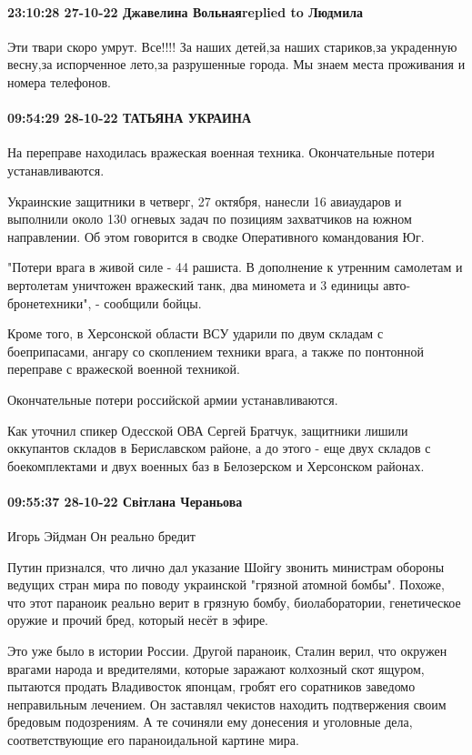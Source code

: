 \paragraph{23:10:28 27-10-22 Джавелина Вольнаяreplied to Людмила}

Эти твари скоро умрут. Все!!!! За наших детей,за наших стариков,за украденную
весну,за испорченное лето,за разрушенные города. Мы знаем места проживания и
номера телефонов.

\paragraph{09:54:29 28-10-22 ТАТЬЯНА УКРАИНА}

На переправе находилась вражеская военная техника. Окончательные потери
устанавливаются.

Украинские защитники в четверг, 27 октября, нанесли 16 авиаударов и выполнили
около 130 огневых задач по позициям захватчиков на южном направлении. Об этом
говорится в сводке Оперативного командования Юг.

"Потери врага в живой силе - 44 рашиста. В дополнение к утренним самолетам и
вертолетам уничтожен вражеский танк, два миномета и 3 единицы
авто-бронетехники", - сообщили бойцы.

Кроме того, в Херсонской области ВСУ ударили по двум складам с боеприпасами,
ангару со скоплением техники врага, а также по понтонной переправе с вражеской
военной техникой.

Окончательные потери российской армии устанавливаются.

Как уточнил спикер Одесской ОВА Сергей Братчук, защитники лишили оккупантов
складов в Бериславском районе, а до этого - еще двух складов с боекомплектами и
двух военных баз в Белозерском и Херсонском районах.

\paragraph{09:55:37 28-10-22 Світлана Чераньова}
Игорь Эйдман
Он реально бредит

Путин признался, что лично дал указание Шойгу звонить министрам обороны ведущих
стран мира по поводу украинской "грязной атомной бомбы". Похоже, что этот
параноик реально верит в грязную бомбу, биолаборатории, генетическое оружие и
прочий бред, который несёт в эфире.

Это уже было в истории России. Другой параноик, Сталин верил, что окружен
врагами народа и вредителями, которые заражают колхозный скот ящуром, пытаются
продать Владивосток японцам, гробят его соратников заведомо неправильным
лечением. Он заставлял чекистов находить подтвержения своим бредовым
подозрениям. А те сочиняли ему донесения и уголовные дела, соответствующие его
параноидальной картине мира.


